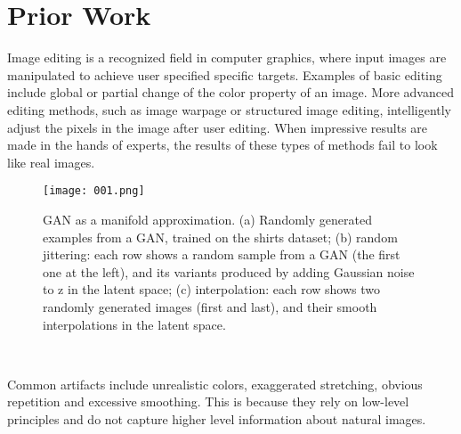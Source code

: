 \documentclass[30pt,twocolumn,letterpaper]{article}
\begin{document}
\section{Prior Work}
Image editing is a recognized field in computer graphics, where input images are manipulated to achieve user specified specific targets. Examples of basic editing include global or partial change of the color property of an image. More advanced editing methods, such as image warpage or structured image editing, intelligently adjust the pixels in the image after user editing. When impressive results are made in the hands of experts, the results of these types of methods fail to look like real images.\\
\begin{figure}[htbp]
\small
\centering
\texttt{[image: 001.png]}
\caption{GAN as a manifold approximation. (a) Randomly generated examples from a
GAN, trained on the shirts dataset; (b) random jittering: each row shows a random
sample from a GAN (the first one at the left), and its variants produced by adding
Gaussian noise to z in the latent space; (c) interpolation: each row shows two randomly
generated images (first and last), and their smooth interpolations in the latent space.}
\label{fig:lable}
\end{figure}\\
\par
Common artifacts include unrealistic colors, exaggerated stretching, obvious repetition and excessive smoothing. This is because they rely on low-level principles and do not capture higher level information about natural images\cite{Massimiliano2011The}.
{\small


}
\end{document}
